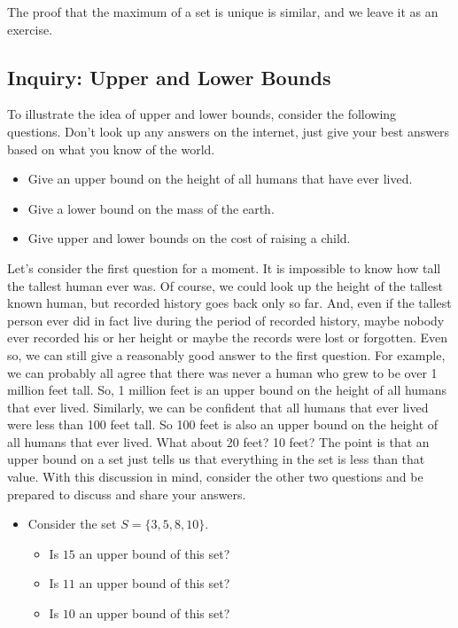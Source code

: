 \documentclass[11pt]{article}
\newenvironment{task}
	{\begin{mdframed}[linecolor=lightgray, linewidth=3pt]\raggedright}
	{\end{mdframed}}
\theoremstyle{definition}
\begin{document}
The proof that the maximum of a set is unique is similar, and we leave it as an exercise.

\subsection{Inquiry: Upper and Lower Bounds}
\begin{task}
  To illustrate the idea of upper and lower bounds, consider the following questions. Don't look up any answers on the internet, just give your best answers
  based on what you know of the world.
  \begin{itemize}
    \item Give an upper bound on the height of all humans that have ever lived.
    \item Give a lower bound on the mass of the earth.
    \item Give upper and lower bounds on the cost of raising a child.
  \end{itemize}
  Let's consider the first question for a moment. It is impossible to know how tall the tallest human ever was. Of course, we could look up the
  height of the tallest known human, but recorded history goes back only so far. And, even if the tallest person ever did in fact live during the
  period of recorded history, maybe nobody ever recorded his or her height or maybe the records were lost or forgotten. Even so, we can still give
  a reasonably good answer to the first question. For example, we can probably all agree that there was never a human who grew to be over 1 million
  feet tall. So, 1 million feet is an upper bound on the height of all humans that ever lived. Similarly, we can be confident that all humans that
  ever lived were less than 100 feet tall. So 100 feet is also an upper bound on the height of all humans that ever lived. What about 20 feet? 10 feet?
  The point is that an upper bound on a set just tells us that everything in the set is less than that value. With this discussion in mind, consider
  the other two questions and be prepared to discuss and share your answers.
  \begin{itemize}
    \item Consider the set $S = \{ 3, 5, 8, 10\}$.
      \begin{itemize}
        \item Is $15$ an upper bound of this set?
        \item Is $11$ an upper bound of this set?
        \item Is $10$ an upper bound of this set?

\end{itemize}
\end{itemize}
\end{task}
\end{document}
